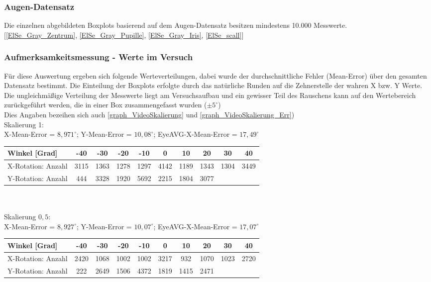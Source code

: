 \subsubsection*{Augen-Datensatz \cite{database_Eye}}
Die einzelnen abgebildeten Boxplots basierend auf dem Augen-Datensatz \cite{database_Eye} besitzen mindestens 10.000 Messwerte.\\
$[$\autoref{ElSe_Gray_Zentrum}, \autoref{ElSe_Gray_Pupille}, \autoref{ElSe_Gray_Iris}, \autoref{ElSe_scall}$]$
\subsubsection*{Aufmerksamkeitsmessung - Werte im Versuch}
Für diese Auswertung ergeben sich folgende Werteverteilungen, dabei wurde der durchschnittliche Fehler (Mean-Error) über den gesamten Datensatz bestimmt. Die Einteilung der Boxplots erfolgte durch das natürliche Runden auf die Zehnerstelle der wahren X bzw. Y Werte. Die ungleichmäßige Verteilung der Messwerte liegt am Versuchsaufbau und ein gewisser Teil des Rauschens kann auf den Wertebereich zurückgeführt werden, die in einer Box zusammengefasst wurden ($\pm 5^\circ$)\\
Dies Angaben bezeihen sich auch  \autoref{graph_VideoSkalierung} und \autoref{graph_VideoSkalierung_Err})\\
Skalierung 1:\\
X-Mean-Error = $8,971^\circ$; Y-Mean-Error = $10,08^\circ$; EyeAVG-X-Mean-Error = $17,49^\circ$\\
\begin{tabular}{|l|c|c|c|c|c|c|c|c|c|}
	\hline 
	Winkel [Grad]&-40&-30&-20&-10&0&10&20&30&40\\
	\hline 
	X-Rotation: Anzahl&3115&1363&1278&1297&4142&1189&1343&1304&3449\\ 
	\hline 
	Y-Rotation: Anzahl&444&3328&1920&5692&2215&1804&3077&&\\
	\hline
\end{tabular}\\\\
Skalierung $0,5$:\\
X-Mean-Error = $8,927^\circ$; Y-Mean-Error = $10,07^\circ$; EyeAVG-X-Mean-Error = $17,07^\circ$\\
\begin{tabular}{|l|c|c|c|c|c|c|c|c|c|}
	\hline 
	Winkel [Grad]&-40&-30&-20&-10&0&10&20&30&40\\
	\hline 
	X-Rotation: Anzahl&2420&1068&1002&1002&3217&932&1070&1023&2720\\ 
	\hline 
	Y-Rotation: Anzahl&222&2649&1506&4372&1819&1415&2471&&\\
	\hline
\end{tabular}\\\\
